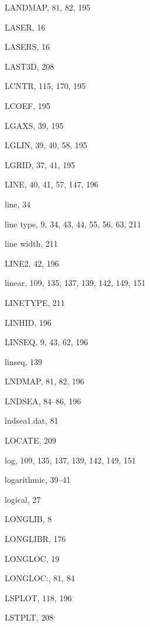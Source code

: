 \begin{theindex}
  \item LANDMAP, 81, 82, 195
  \item LASER, 16
  \item LASERS, 16
  \item LAST3D, 208
  \item LCNTR, 115, 170, 195
  \item LCOEF, 195
  \item LGAXS, 39, 195
  \item LGLIN, 39, 40, 58, 195
  \item LGRID, 37, 41, 195
  \item LINE, 40, 41, 57, 147, 196
  \item line, 34
  \item line type, 9, 34, 43, 44, 55, 56, 63, 211
  \item line width, 211
  \item LINE2, 42, 196
  \item linear, 109, 135, 137, 139, 142, 149, 151
  \item LINETYPE, 211
  \item LINHID, 196
  \item LINSEQ, 9, 43, 62, 196
  \item linseq, 139
  \item LNDMAP, 81, 82, 196
  \item LNDSEA, 84--86, 196
  \item lndsea1.dat, 81
  \item LOCATE, 209
  \item log, 109, 135, 137, 139, 142, 149, 151
  \item logarithmic, 39--41
  \item logical, 27
  \item LONGLIB, 8
  \item LONGLIBR, 176
  \item LONGLOC, 19
  \item LONGLOC:, 81, 84
  \item LSPLOT, 118, 196
  \item LSTPLT, 208

  \indexspace


\end{theindex}
